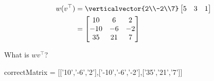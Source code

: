 \documentclass{ximera}
\begin{document}
\begin{question}
  \begin{solution}
    \begin{hint}
      \begin{align*}
        w(v^\top) &=  \verticalvector{2\\-2\\7}\begin{bmatrix} 5 & 3 & 1\end{bmatrix}\\
        &=\begin{bmatrix}
          10  & 6 & 2\\
          -10 & -6& -2\\
          35  & 21& 7
        \end{bmatrix}
      \end{align*}
    \end{hint}
    What is $wv^\top$? 
    \begin{matrix-answer}
      correctMatrix = [['10','-6','2'],['-10','-6','-2'],['35','21','7']]
    \end{matrix-answer}
  \end{solution}
\end{question}
\end{document}
